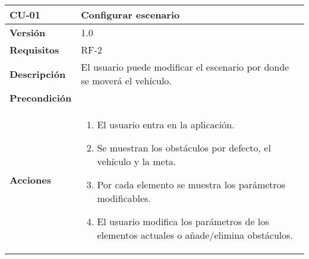 \begin{longtable}[H]{@{}ll@{}}
\toprule
\begin{minipage}[b]{0.23\columnwidth}\raggedright\strut
\textbf{CU-01}\strut
\end{minipage} & \begin{minipage}[b]{0.71\columnwidth}\raggedright\strut
\textbf{Configurar escenario}\strut
\end{minipage}\tabularnewline
\midrule
\endhead

\begin{minipage}[t]{0.23\columnwidth}\raggedright\strut
\textbf{Versión}\strut
\end{minipage} & \begin{minipage}[t]{0.71\columnwidth}\raggedright\strut
1.0\strut
\end{minipage}\tabularnewline

\begin{minipage}[t]{0.23\columnwidth}\raggedright\strut
\textbf{Requisitos}\strut
\end{minipage} & \begin{minipage}[t]{0.71\columnwidth}\raggedright\strut
RF-2\strut
\end{minipage}\tabularnewline

\begin{minipage}[t]{0.23\columnwidth}\raggedright\strut
\textbf{Descripción}\strut
\end{minipage} & \begin{minipage}[t]{0.71\columnwidth}\raggedright\strut
El usuario puede modificar el escenario por donde se moverá el vehículo.\strut
\end{minipage}\tabularnewline

\begin{minipage}[t]{0.23\columnwidth}\raggedright\strut
\textbf{Precondición}\strut
\end{minipage} & \begin{minipage}[t]{0.71\columnwidth}\raggedright\strut\strut
\end{minipage}\tabularnewline

\begin{minipage}[t]{0.23\columnwidth}\raggedright\strut
\textbf{Acciones}\strut
\end{minipage} & \begin{minipage}[t]{0.71\columnwidth}\raggedright\strut
\begin{enumerate}
\def\labelenumi{\arabic{enumi}.}
\tightlist
\item
  El usuario entra en la aplicación.
\item
  Se muestran los obstáculos por defecto, el vehículo y la meta.
\item
  Por cada elemento se muestra los parámetros modificables.
\item
  El usuario modifica los parámetros de los elementos actuales o añade/elimina obstáculos.
\end{enumerate}\strut
\end{minipage}\tabularnewline


\end{longtable}
